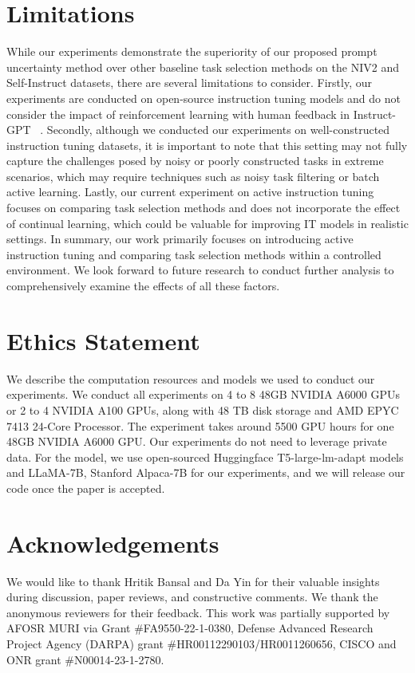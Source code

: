 \documentclass[11pt]{article}
\begin{document}











\section*{Limitations}
While our experiments demonstrate the superiority of our proposed prompt uncertainty method over other baseline task selection methods on the NIV2 and Self-Instruct datasets, there are several limitations to consider. Firstly, our experiments are conducted on open-source instruction tuning models and do not consider the impact of reinforcement learning with human feedback in Instruct-GPT ~\cite{ouyang2022training}.
Secondly, although we conducted our experiments on well-constructed instruction tuning datasets, it is important to note that this setting may not fully capture the challenges posed by noisy or poorly constructed tasks in extreme scenarios, which may require techniques such as noisy task filtering or batch active learning.
Lastly, our current experiment on active instruction tuning focuses on comparing task selection methods and does not incorporate the effect of continual learning, which could be valuable for improving IT models in realistic settings.
In summary, our work primarily focuses on introducing active instruction tuning and comparing task selection methods within a controlled environment. We look forward to future research to conduct further analysis to comprehensively examine the effects of all these factors. 
\section*{Ethics Statement}
We describe the computation resources and models we used to conduct our experiments. We conduct all experiments on 4 to 8 48GB NVIDIA A6000 GPUs or 2 to 4 NVIDIA A100 GPUs, along with 48 TB disk storage and AMD EPYC 7413 24-Core Processor. The experiment takes around 5500 GPU hours for one 48GB NVIDIA A6000 GPU. Our experiments do not need to leverage private data. For the model, we use open-sourced Huggingface T5-large-lm-adapt models and LLaMA-7B, Stanford Alpaca-7B for our experiments, and we will release our code once the paper is accepted.
\section*{Acknowledgements}
We would like to thank Hritik Bansal and Da Yin for their valuable insights during discussion, paper reviews, and constructive comments.
We thank the anonymous reviewers for their feedback.
This work was partially supported by AFOSR MURI via Grant \#FA9550-22-1-0380, Defense Advanced Research Project Agency (DARPA) grant \#HR00112290103/HR0011260656, CISCO and ONR grant \#N00014-23-1-2780.


\end{document}
